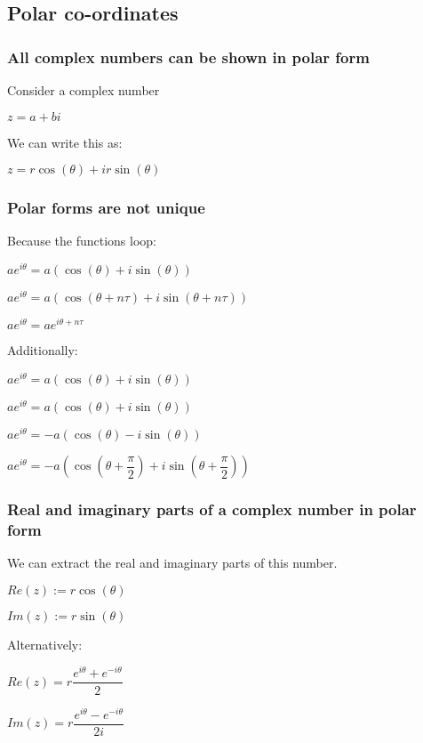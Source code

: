 
\subsection{Polar co-ordinates}

\subsubsection{All complex numbers can be shown in polar form}

Consider a complex number

\(z=a+bi\)

We can write this as:

\(z=r\cos(\theta ) + ir\sin(\theta )\)

\subsubsection{Polar forms are not unique}

Because the functions loop:

\(ae^{i\theta }=a(\cos(\theta )+i\sin(\theta ))\)

\(ae^{i\theta }=a(\cos(\theta +n\tau )+i\sin(\theta +n\tau ))\)

\(ae^{i\theta }= ae^{i\theta +n\tau}\)

Additionally:

\(ae^{i\theta }=a(\cos(\theta )+i\sin(\theta ))\)

\(ae^{i\theta }=a(\cos(\theta )+i\sin(\theta ))\)

\(ae^{i\theta }=-a(\cos(\theta )-i\sin(\theta ))\)

\(ae^{i\theta }=-a(\cos(\theta +\dfrac{\pi }{2})+i\sin(\theta +\dfrac{\pi }{2}))\)

\subsubsection{Real and imaginary parts of a complex number in polar form}

We can extract the real and imaginary parts of this number.

\(Re(z):=r\cos (\theta )\)

\(Im(z):=r\sin (\theta )\)

Alternatively:

\(Re(z)=r\dfrac{e^{i\theta }+e^{-i\theta }}{2}\)

\(Im(z)=r\dfrac{e^{i\theta }-e^{-i\theta }}{2i}\)

